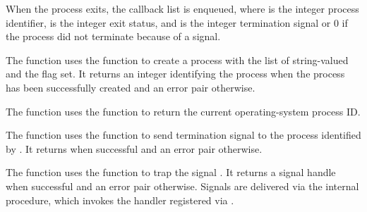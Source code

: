 When the process exits, the callback list  is enqueued, where
 is the integer process identifier,  is the
integer exit status, and  is the integer termination
signal or 0 if the process did not terminate because of a signal.

\begin{function}
\end{function}

The  function uses the 
function to create a process with the list of string-valued 
and the  flag set. It returns an integer
identifying the process when the process has been successfully created
and an error pair otherwise.

\begin{function}
\end{function}

The  function uses the 
function to return the current operating-system process ID.

\begin{function}
\end{function}

The  function uses the  function to
send termination signal  to the process identified by
. It returns  when successful and an error pair
otherwise.

\begin{function}
\end{function}

The  function uses the 
function to trap the signal .
It returns a signal handle when successful and an error pair
otherwise.
Signals are delivered via the internal  procedure, which
invokes the handler registered via .

\begin{function}
\end{function}

